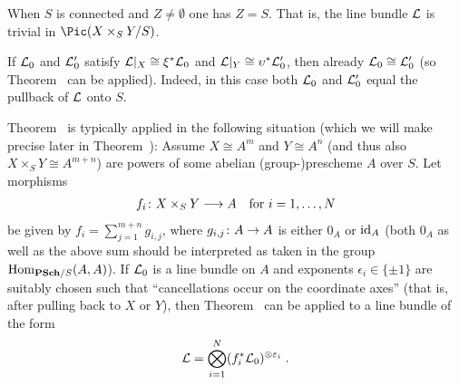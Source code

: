 \documentclass[a4paper,parskip=half,numbers=enddot, DIV=12]{scrreprt}
\begin{document}
\begin{rem}
	\begin{alphanumerate}
		\item When $S$ is connected and $Z\neq\emptyset$ one has $Z=S$. That is, the line bundle $\mathcal{L}$ is trivial in $\Pic(X\times_SY/S)$.
		\item If $\mathcal{L}_0$ and $\mathcal{L}_0'$ satisfy $\mathcal{L}|_X\cong \xi^*\mathcal{L}_0$ and $\mathcal{L}|_Y\cong \upsilon^*\mathcal{L}_0'$, then already $\mathcal{L}_0\cong \mathcal{L}_0'$ (so Theorem~ can be applied). Indeed, in this case both $\mathcal{L}_0$ and $\mathcal{L}_0'$ equal the pullback of $\mathcal{L}$ onto $S$.
		\item Theorem~ is typically applied in the following situation (which we will make precise later in Theorem~): Assume $X\cong A^m$ and $Y\cong A^n$ (and thus also $X\times_SY\cong A^{m+n}$) are powers of some abelian (group-)prescheme $A$ over $S$. Let morphisms
		\begin{align*}
			f_i\colon X\times_SY\morphism A\quad\text{for }i=1,\ldots,N
		\end{align*}
		be given by $f_i=\sum_{j=1}^{m+n}g_{i,j}$, where $g_{i,j}\colon A\morphism A$ is either $0_A$ or $\operatorname{id}_A$ (both $0_A$ as well as the above sum should be interpreted as taken in the group $\Hom_{\cat{PSch}/S}(A,A)$). If $\mathcal{L}_0$ is a line bundle on $A$ and exponents $\epsilon_i\in\{\pm 1\}$ are suitably chosen such that ``cancellations occur on the coordinate axes'' (that is, after pulling back to $X$ or $Y$), then Theorem~ can be applied to a line bundle of the form 
		\begin{align*}
			\mathcal{L}=\bigotimes_{i=1}^N(f_i^*\mathcal{L}_0)^{\otimes\varepsilon_i}\;.
		\end{align*}
	\end{alphanumerate}
\end{rem}
\end{document}
